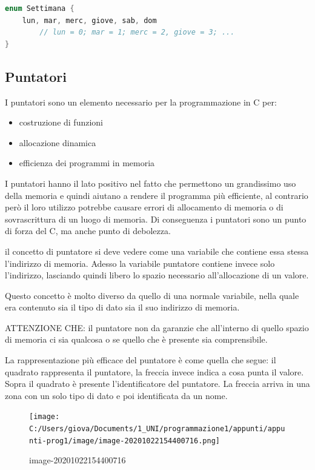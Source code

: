 \documentclass[
  paper=a4,
  oneside  ,captions=tableheading
]{scrbook}
\begin{document}
\begin{lstlisting}[language=C]
enum Settimana {
    lun, mar, merc, giove, sab, dom
        // lun = 0; mar = 1; merc = 2, giove = 3; ...
}
\end{lstlisting}

\hypertarget{puntatori}{%
\subsection{Puntatori}\label{puntatori}}

I puntatori sono un elemento necessario per la programmazione in C per:

\begin{itemize}
\item
  costruzione di funzioni
\item
  allocazione dinamica
\item
  efficienza dei programmi in memoria
\end{itemize}

I puntatori hanno il lato positivo nel fatto che permettono un
grandissimo uso della memoria e quindi aiutano a rendere il programma
più efficiente, al contrario però il loro utilizzo potrebbe causare
errori di allocamento di memoria o di sovrascrittura di un luogo di
memoria. Di conseguenza i puntatori sono un punto di forza del C, ma
anche punto di debolezza.

il concetto di puntatore si deve vedere come una variabile che contiene
essa stessa l'indirizzo di memoria. Adesso la variabile puntatore
contiene invece solo l'indirizzo, lasciando quindi libero lo spazio
necessario all'allocazione di un valore.

Questo concetto è molto diverso da quello di una normale variabile,
nella quale era contenuto sia il tipo di dato sia il suo indirizzo di
memoria.

ATTENZIONE CHE: il puntatore non da garanzie che all'interno di quello
spazio di memoria ci sia qualcosa o se quello che è presente sia
comprensibile.

La rappresentazione più efficace del puntatore è come quella che segue:
il quadrato rappresenta il puntatore, la freccia invece indica a cosa
punta il valore. Sopra il quadrato è presente l'identificatore del
puntatore. La freccia arriva in una zona con un solo tipo di dato e poi
identificata da un nome.

\begin{figure}
\centering
\texttt{[image: C:/Users/giova/Documents/1\_UNI/programmazione1/appunti/appunti-prog1/image/image-20201022154400716.png]}
\caption{image-20201022154400716}
\end{figure}
\end{document}
